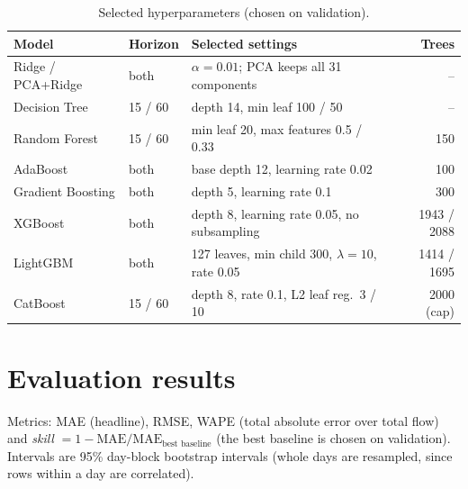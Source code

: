 ﻿\documentclass[11pt,a4paper]{article}
\begin{document}
\begin{table}[H]\centering\small
\begin{tabular}{llp{5.7cm}r}
\toprule Model & Horizon & Selected settings & Trees \\ \midrule
Ridge / PCA+Ridge & both & $\alpha=0.01$; PCA keeps all 31 components & -- \\
Decision Tree & 15 / 60 & depth 14, min leaf 100 / 50 & -- \\
Random Forest & 15 / 60 & min leaf 20, max features 0.5 / 0.33 & 150 \\
AdaBoost & both & base depth 12, learning rate 0.02 & 100 \\
Gradient Boosting & both & depth 5, learning rate 0.1 & 300 \\
XGBoost & both & depth 8, learning rate 0.05, no subsampling & 1943 / 2088 \\
LightGBM & both & 127 leaves, min child 300, $\lambda=10$, rate 0.05 & 1414 / 1695 \\
CatBoost & 15 / 60 & depth 8, rate 0.1, L2 leaf reg.\ 3 / 10 & 2000 (cap) \\ \bottomrule
\end{tabular}
\caption{Selected hyperparameters (chosen on validation).}\label{tab:set}
\end{table}

\section{Evaluation results}
Metrics: MAE (headline), RMSE, WAPE (total absolute error over total flow) and \emph{skill} $=1-\mathrm{MAE}/\mathrm{MAE}_{\text{best baseline}}$ (the best baseline is chosen on validation).
Intervals are 95\% day-block bootstrap intervals (whole days are resampled, since rows within a day are correlated).
\end{document}
